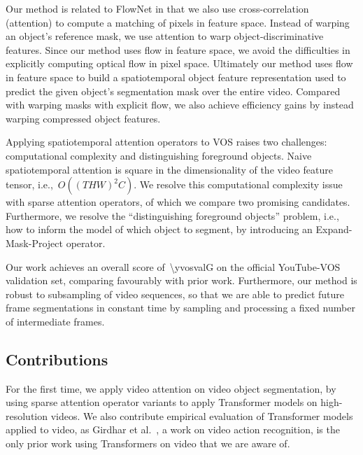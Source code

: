 Our method is related to FlowNet in that we also use cross-correlation
(attention) to compute a matching of pixels in feature space.
Instead of warping an object's reference mask, we use attention to warp
object-discriminative features.
Since our method uses flow in feature space, we avoid the difficulties in
explicitly computing optical flow in pixel space.
Ultimately our method uses flow in feature space to build a spatiotemporal
object feature representation used to predict the given object's segmentation
mask over the entire video.
Compared with warping masks with explicit flow, we also achieve efficiency
gains by instead warping compressed object features.

Applying spatiotemporal attention operators to VOS raises two challenges:
computational complexity and distinguishing foreground objects.
Naive spatiotemporal attention is square in the dimensionality of the video
feature tensor, i.e.,~$O({(THW)}^2 C)$.
We resolve this computational complexity issue with sparse attention operators,
of which we compare two promising candidates.
Furthermore, we resolve the ``distinguishing foreground objects'' problem,
i.e., how to inform the model of which object to segment, by introducing an
Expand-Mask-Project operator.

Our work achieves an overall score of~\num{\yvosvalG} on the official
YouTube-VOS validation set, comparing favourably with prior work.
Furthermore, our method is robust to subsampling of video sequences, so that we
are able to predict future frame segmentations in constant time by sampling and
processing a fixed number of intermediate frames.


\subsection{Contributions}

For the first time, we apply video attention on video object segmentation, by
using sparse attention operator variants to apply Transformer models on
high-resolution videos.
We also contribute empirical evaluation of Transformer models applied to video,
as Girdhar et al.~\cite{girdhar2019video}, a work on video action recognition,
is the only prior work using Transformers on video that we are aware of.

